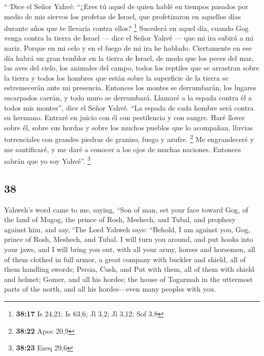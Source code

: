 \begin{paracol}{2}
 ``\,`Dice el Señor Yahvé: ``¿Eres tú aquel de quien
hablé en tiempos pasados por medio de mis siervos los profetas de
Israel, que profetizaron en aquellos días durante años que te llevaría
contra ellos? \footnote{\textbf{38:17} Is 24,21; Is 63,6; Jl 3,2; Jl
  3,12; Sof 3,8}  Sucederá en aquel día, cuando Gog venga
contra la tierra de Israel --- dice el Señor Yahvé --- que mi ira subirá
a mi nariz.  Porque en mi celo y en el fuego de mi ira he
hablado. Ciertamente en ese día habrá un gran temblor en la tierra de
Israel,  de modo que los peces del mar, las aves del
cielo, los animales del campo, todos los reptiles que se arrastran sobre
la tierra y todos los hombres que están sobre la superficie de la tierra
se estremecerán ante mi presencia. Entonces los montes se derrumbarán,
los lugares escarpados caerán, y todo muro se derrumbará.
 Llamaré a la espada contra él a todos mis montes'', dice
el Señor Yahvé. ``La espada de cada hombre será contra su hermano.
 Entraré en juicio con él con pestilencia y con sangre.
Haré llover sobre él, sobre sus hordas y sobre los muchos pueblos que lo
acompañan, lluvias torrenciales con grandes piedras de granizo, fuego y
azufre. \footnote{\textbf{38:22} Apoc 20,9}  Me
engrandeceré y me santificaré, y me daré a conocer a los ojos de muchas
naciones. Entonces sabrán que yo soy Yahvé''. \footnote{\textbf{38:23}
  Ezeq 29,6}

\switchcolumn
\begin{otherlanguage}{english}

\hypertarget{section-75}{%
\section{38}\label{section-75}}

 Yahweh's word came to me, saying,  ``Son of
man, set your face toward Gog, of the land of Magog, the prince of Rosh,
Meshech, and Tubal, and prophesy against him,  and say,
`The Lord Yahweh says: ``Behold, I am against you, Gog, prince of Rosh,
Meshech, and Tubal.  I will turn you around, and put hooks
into your jaws, and I will bring you out, with all your army, horses and
horsemen, all of them clothed in full armor, a great company with
buckler and shield, all of them handling swords;  Persia,
Cush, and Put with them, all of them with shield and helmet;
 Gomer, and all his hordes; the house of Togarmah in the
uttermost parts of the north, and all his hordes---even many peoples
with you.


\end{otherlanguage}
\end{paracol}
